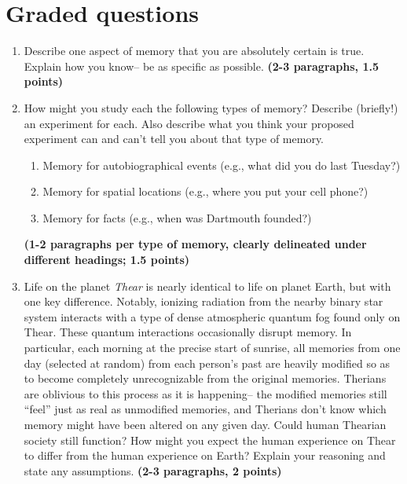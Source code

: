 \documentclass[11pt]{article}
\begin{document}
\section*{Graded questions}
\begin{enumerate}

\item Describe one aspect of memory that you are absolutely certain is
  true.  Explain how you know-- be as specific as possible.
  \textbf{(2-3 paragraphs, 1.5 points)}

\item How might you study each the following types of
  memory?  Describe (briefly!) an experiment for each.  Also describe
  what you think your proposed experiment can and can't tell you about that
  type of memory.
  \begin{enumerate}
  \item Memory for autobiographical events (e.g., what did you do last Tuesday?)
    \item Memory for spatial locations (e.g., where you put your cell
      phone?)
      \item Memory for facts (e.g., when was Dartmouth founded?)
      \end{enumerate}
\textbf{(1-2 paragraphs per type of memory, clearly delineated under
  different headings; 1.5 points)}

\item Life on the planet \textit{Thear} is nearly identical to life on
  planet Earth, but with one key difference.  Notably, ionizing
  radiation from the nearby binary star system interacts with a type
  of dense atmospheric quantum fog found only on Thear.  These quantum
  interactions occasionally disrupt memory.  In particular, each
  morning at the precise start of sunrise, all memories from one day
  (selected at random) from each person's past are heavily modified so
  as to become completely unrecognizable from the original memories.
  Therians are oblivious to this process as it is happening-- the
  modified memories still ``feel'' just as real as unmodified
  memories, and Therians don't know which memory might have been
  altered on any given day.  Could human Thearian society still
  function?  How might you expect the human experience on Thear to
  differ from the human experience on Earth?  Explain your reasoning
  and state any assumptions.  \textbf{(2-3 paragraphs, 2 points)}
\end{enumerate}
\end{document}
